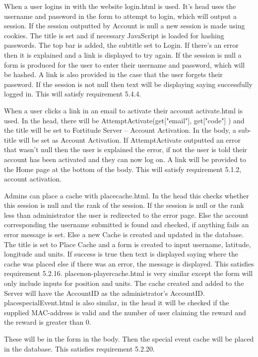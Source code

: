 When a user logins in with the website login.html is used. It's head uses the username and password in the form to attempt to login, which will output a session. If the session outputted by Account is null a new session is made using cookies. The title is set and if necessary JavaScript is loaded for hashing passwords. The top bar is added, the subtitle set to Login. If there's an error then it is explained and a link is displayed to try again. If the session is null a form is produced for the user to enter their username and password, which will be hashed. A link is also provided in the case that the user forgets their password. If the session is not null then text will be displaying saying successfully logged in. This will satisfy requirement 5.4.4.

When a user clicks a link in an email to activate their account activate.html is used. In the head, there will be AttemptActivate(get["email"], get["code"] ) and the title will be set to Fortitude Server – Account Activation. In the body, a sub-title will be set as Account Activation. If AttemptActivate outputted an error that wasn't null then the user is explained the error, if not the user is told their account has been activated and they can now log on. A link will be provided to the Home page at the bottom of the body. This will satisfy requirement 5.1.2, account activation.

Admins can place a cache with placecache.html. In the head this checks whether this session is null and the rank of the session. If the session is null or the rank less than administrator the user is redirected to the error page. Else the account corresponding the username submitted is found and checked, if anything fails an error message is set. Else a new Cache is created and updated in the database. The title is set to Place Cache and a form is created to input username, latitude, longitude and units. If success is true then text is displayed saying where the cache was placed else if there was an error, the message is displayed. This satisfies requirement 5.2.16. placenon-playercache.html is very similar except the form will only include inputs for position and units. The cache created and added to the Server will have the AccountID as the administrator's AccountID. placespecialEvent.html is also similar, in the head it will be checked if the supplied MAC-address is valid and the number of user claiming the reward and the reward is greater than 0.

These will be in the form in the body. Then the special event cache will be placed in the database. This satisfies requirement 5.2.20.

